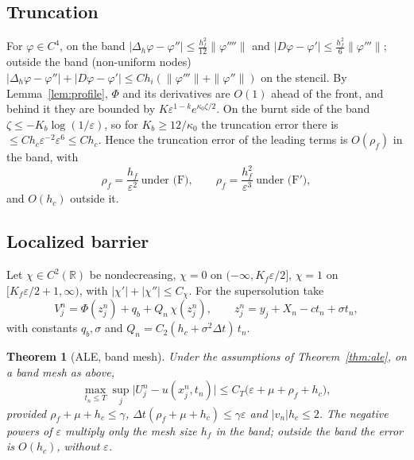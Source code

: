 \documentclass[11pt]{amsart}
\newtheorem{theorem}{Theorem}[section]
\theoremstyle{remark}
\newcommand{\ve}{\varepsilon}
\newcommand{\R}{\mathbb{R}}
\begin{document}
\subsection*{Truncation} For $\varphi\in C^4$, on the band
$|\Delta_h\varphi-\varphi''|\le\frac{h_f^2}{12}\|\varphi''''\|$ and
$|D\varphi-\varphi'|\le\frac{h_f^2}6\|\varphi'''\|$; outside the band (non-uniform
nodes) $|\Delta_h\varphi-\varphi''|+|D\varphi-\varphi'|\le C h_i(\|\varphi'''\|+\|\varphi''\|)$
on the stencil. By Lemma~\ref{lem:profile}, $\Phi$ and its derivatives are
$O(1)$ ahead of the front, and behind it they are bounded by
$K\ve^{1-k}e^{\kappa_0\zeta/2}$. On the burnt side of the band
$\zeta\le-K_b\log(1/\ve)$, so for $K_b\ge12/\kappa_0$ the truncation error there is
$\le Ch_c\ve^{-2}\ve^{6}\le Ch_c$. Hence the truncation error of the leading terms
is $O(\rho_f)$ in the band, with
\[
\rho_f=\frac{h_f}{\ve^2}\ \text{under (F)},\qquad \rho_f=\frac{h_f^2}{\ve^3}\ \text{under (F$'$)},
\]
and $O(h_c)$ outside it.

\subsection*{Localized barrier} Let $\chi\in C^2(\R)$ be nondecreasing,
$\chi=0$ on $(-\infty,K_f\ve/2]$, $\chi=1$ on $[K_f\ve/2+1,\infty)$, with
$|\chi'|+|\chi''|\le C_\chi$. For the supersolution take
\[
V^n_j=\Phi(z^n_j)+q_b+Q_n\,\chi(z^n_j),\qquad z^n_j=y_j+X_n-ct_n+\sigma t_n ,
\]
with constants $q_b,\sigma$ and $Q_n=C_2(h_c+\sigma^2\Delta t)\,t_n$.

\begin{theorem}[ALE, band mesh]\label{thm:band}
Under the assumptions of Theorem~\ref{thm:ale}, on a band mesh as above,
\[
\max_{t_n\le T}\sup_j\big|U^n_j-u(x^n_j,t_n)\big|\le C_T\big(\ve+\mu+\rho_f+h_c\big),
\]
provided $\rho_f+\mu+h_c\le\gamma$, $\Delta t(\rho_f+\mu+h_c)\le\gamma\ve$ and
$|v_n|h_c\le2$. The negative powers of $\ve$ multiply only the mesh size $h_f$
in the band; outside the band the error is $O(h_c)$, without $\ve$.
\end{theorem}
\end{document}
